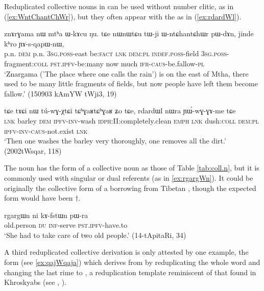 Reduplicated collective nouns in  can be used without number clitic, as in (\ref{ex:WntChantChWr}), but they often appear with the  as in (\ref{ex:rdardWl}).

\begin{exe}
\ex \label{ex:WntChantChWr}
\gll znɤrɣama nɯ mtʰa ɯ-kɤcu ŋu. tɕe nɯnɯtɕu tɯ-ji ɯ-ntɕhantɕhɯr pɯ-dɤn, jinde kʰro ɲɤ-s-qapɯ-nɯ,\\
p.n. \textsc{dem} p.n. \textsc{3sg.poss}-east be:\textsc{fact} \textsc{lnk} \textsc{dem:pl} \textsc{indef}.\textsc{poss}-field \textsc{3sg.poss}-fragment:\textsc{coll} \textsc{pst}.\textsc{ipfv}-be:many now much \textsc{ifr}-\textsc{caus}-be.fallow-\textsc{pl}\\
\glt `Znargama ('The place where one calls the rain') is on the east of Mtha, there used to be many little fragments of fields, but now people have left them become fallow.' (150903 kAmYW tWji3, 19)
\end{exe}

\begin{exe}
\ex \label{ex:rdardWl}
\gll tɕe tɤɕi nɯ tú-wɣ-χtɕi tɕʰɣaʁtɕʰɣaʁ ʑo tɕe, rdardɯl nɯra ɲɯ́-wɣ-ɣɤ-me tɕe \\
\textsc{lnk} barley \textsc{dem} \textsc{ipfv}-\textsc{inv}-wash \textsc{idph}:II:completely.clean \textsc{emph} \textsc{lnk} dush:\textsc{coll} \textsc{dem:pl} \textsc{ipfv}-\textsc{inv}-\textsc{caus}-not.exist \textsc{lnk} \\
\glt `Then one washes the barley very thoroughly, one removes all the dirt.' (2002tWsqar, 118)
\end{exe}
 
The noun  has the form of a collective noun as those of Table \ref{tab:coll.n}, but it is commonly used with singular or dual referents (as in \ref{ex:rgargWn}). It could be originally the collective form of a borrowing from Tibetan , though the expected form would have been $\dagger$. 
 
\begin{exe}
\ex \label{ex:rgargWn}
\gll  rgargɯn ni kɤ-fstɯn pɯ-ra \\
old.person \textsc{du} \textsc{inf}-serve \textsc{pst.ipfv}-have.to \\
\glt `She had to take care of two old people.' (14-tApitaRi, 34)
\end{exe}

A third reduplicated collective derivation is only attested by one example, the form  (see \ref{ex:qajWqaja}) which derives from   by reduplicating the whole word and changing the last rime to , a reduplication template reminiscent of that found in Khroskyabs (see \citealt{lai13fuyin}, \citealt[22-24]{lai17khroskyabs}).

